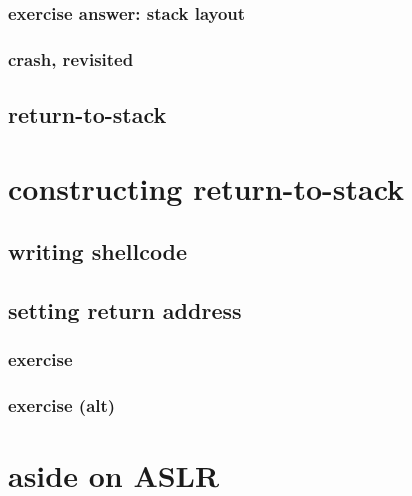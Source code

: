\subsubsection{exercise answer: stack layout}


\subsubsection{crash, revisited}


\subsection{return-to-stack}


\section{constructing return-to-stack}


\subsection{writing shellcode}




\subsection{setting return address}


\subsubsection{exercise}


\subsubsection{exercise (alt)}


\section{aside on ASLR}
